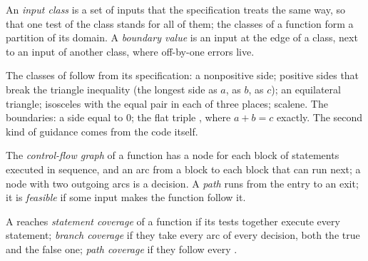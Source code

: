 \begin{definition}\label{def:b1:c-modules-make-tests:input-class}
An \emph{input class} is a set of inputs that the specification treats the same way, so that one
test of the class stands for all of them; the classes of a function form a partition of its domain. A \emph{boundary
value} is an input at the edge of a class, next to an input of another class, where off-by-one
errors live.
\end{definition}

\label{lst:b1:c-modules-make-tests:classify}

The classes of  follow from its specification: a nonpositive side; positive sides that break the
triangle inequality (the longest side as $a$, as $b$, as $c$); an equilateral triangle; isosceles with the equal pair in
each of three places; scalene. The boundaries: a side equal to 0; the flat triple , where $a + b = c$
exactly. The second kind of guidance comes from the code itself.

\begin{definition}\label{def:b1:c-modules-make-tests:cfg}
The \emph{control-flow graph} of a function has a node for each block of statements executed
in sequence, and an arc from a block to each block that can run next; a node with two outgoing arcs is a decision. A
\emph{path} runs from the entry to an exit; it is \emph{feasible} if some input makes the function
follow it.
\end{definition}

\begin{definition}\label{def:b1:c-modules-make-tests:coverage}
A  reaches \emph{statement coverage} of a function if its tests together execute
every statement; \emph{branch coverage} if they take every arc of every decision, both the
true and the false one; \emph{path coverage} if they follow every .
\end{definition}

